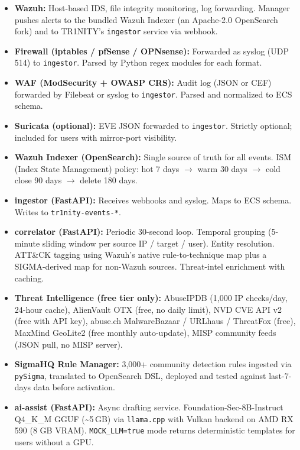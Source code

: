 \documentclass[11pt,a4paper]{article}
\begin{document}
\begin{itemize}[leftmargin=*, itemsep=2pt]
  \item \textbf{Wazuh:} Host-based IDS, file integrity monitoring, log forwarding. Manager pushes alerts to the bundled Wazuh Indexer (an Apache-2.0 OpenSearch fork) and to TR1NITY's \texttt{ingestor} service via webhook.
  \item \textbf{Firewall (iptables / pfSense / OPNsense):} Forwarded as syslog (UDP 514) to \texttt{ingestor}. Parsed by Python regex modules for each format.
  \item \textbf{WAF (ModSecurity + OWASP CRS):} Audit log (JSON or CEF) forwarded by Filebeat or syslog to \texttt{ingestor}. Parsed and normalized to ECS schema.
  \item \textbf{Suricata (optional):} EVE JSON forwarded to \texttt{ingestor}. Strictly optional; included for users with mirror-port visibility.
  \item \textbf{Wazuh Indexer (OpenSearch):} Single source of truth for all events. ISM (Index State Management) policy: hot 7 days $\rightarrow$ warm 30 days $\rightarrow$ cold close 90 days $\rightarrow$ delete 180 days.
  \item \textbf{ingestor (FastAPI):} Receives webhooks and syslog. Maps to ECS schema. Writes to \texttt{tr1nity-events-*}.
  \item \textbf{correlator (FastAPI):} Periodic 30-second loop. Temporal grouping (5-minute sliding window per source IP / target / user). Entity resolution. ATT\&CK tagging using Wazuh's native rule-to-technique map plus a SIGMA-derived map for non-Wazuh sources. Threat-intel enrichment with caching.
  \item \textbf{Threat Intelligence (free tier only):} AbuseIPDB (1,000 IP checks/day, 24-hour cache), AlienVault OTX (free, no daily limit), NVD CVE API v2 (free with API key), abuse.ch MalwareBazaar / URLhaus / ThreatFox (free), MaxMind GeoLite2 (free monthly auto-update), MISP community feeds (JSON pull, no MISP server).
  \item \textbf{SigmaHQ Rule Manager:} 3,000+ community detection rules ingested via \texttt{pySigma}, translated to OpenSearch DSL, deployed and tested against last-7-days data before activation.
  \item \textbf{ai-assist (FastAPI):} Async drafting service. Foundation-Sec-8B-Instruct Q4\_K\_M GGUF (\textasciitilde{}5\,GB) via \texttt{llama.cpp} with Vulkan backend on AMD RX 590 (8 GB VRAM). \texttt{MOCK\_LLM=true} mode returns deterministic templates for users without a GPU.

\end{itemize}
\end{document}
